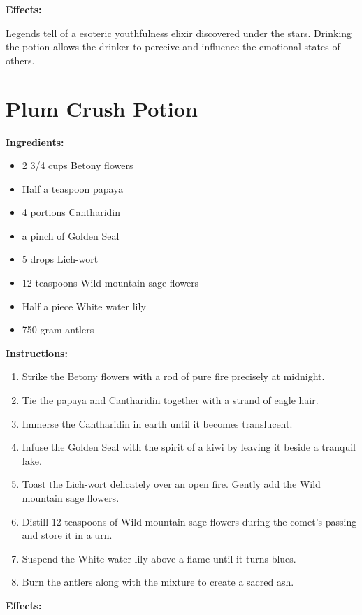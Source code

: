 \documentclass{article}
\begin{document}
\textbf{Effects:}

Legends tell of a esoteric youthfulness elixir discovered under the stars. Drinking the potion allows the drinker to perceive and influence the emotional states of others.

\newpage
\section*{Plum Crush Potion}

\textbf{Ingredients:}

\begin{itemize}
  \item 2 3/4 cups Betony flowers
  \item Half a teaspoon papaya
  \item 4 portions Cantharidin
  \item a pinch of Golden Seal
  \item 5 drops Lich-wort
  \item 12 teaspoons Wild mountain sage flowers
  \item Half a piece White water lily
  \item 750 gram antlers
\end{itemize}

\textbf{Instructions:}

\begin{enumerate}
  \item Strike the Betony flowers with a rod of pure fire precisely at midnight.
  \item Tie the papaya and Cantharidin together with a strand of eagle hair.
  \item Immerse the Cantharidin in earth until it becomes translucent.
  \item Infuse the Golden Seal with the spirit of a kiwi by leaving it beside a tranquil lake.
  \item Toast the Lich-wort delicately over an open fire. Gently add the Wild mountain sage flowers.
  \item Distill 12 teaspoons of Wild mountain sage flowers during the comet’s passing and store it in a urn.
  \item Suspend the White water lily above a flame until it turns blues.
  \item Burn the antlers along with the mixture to create a sacred ash.
\end{enumerate}

\textbf{Effects:}
\end{document}
